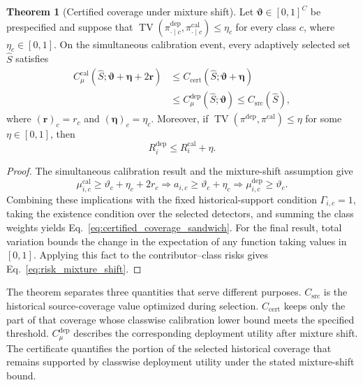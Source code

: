 \documentclass[conference]{IEEEtran}
\theoremstyle{definition}
\newtheorem{theorem}{Theorem}[section]
\begin{document}
\begin{theorem}[Certified coverage under mixture shift]
\label{thm:post_selection_certificates}
Let $\boldsymbol\vartheta\in[0,1]^C$ be prespecified and suppose that
$\operatorname{TV}(\pi_{\cdot\mid c}^{\mathrm{dep}},
\pi_{\cdot\mid c}^{\mathrm{cal}})\le\eta_c$
for every class $c$, where $\eta_c\in[0,1]$.
On the simultaneous calibration event, every adaptively selected set $\widehat S$ satisfies
\begin{equation}
\begin{aligned}
C_\mu^{\mathrm{cal}}(\widehat S;
\boldsymbol\vartheta+\boldsymbol\eta+2\boldsymbol r)
&\le C_{\mathrm{cert}}(\widehat S;
\boldsymbol\vartheta+\boldsymbol\eta)\\
&\le C_\mu^{\mathrm{dep}}(\widehat S;\boldsymbol\vartheta)
\le C_{\mathrm{src}}(\widehat S),
\end{aligned}
\label{eq:certified_coverage_sandwich}
\end{equation}
where $(\boldsymbol r)_c=r_c$ and $(\boldsymbol\eta)_c=\eta_c$.
Moreover, if $\operatorname{TV}(\pi^{\mathrm{dep}},\pi^{\mathrm{cal}})\le\eta$ for some $\eta\in[0,1]$, then
\begin{equation}
R_i^{\mathrm{dep}}\le R_i^{\mathrm{cal}}+\eta.
\label{eq:risk_mixture_shift}
\end{equation}
\end{theorem}

\begin{proof}
The simultaneous calibration result and the mixture-shift assumption give
\[
\mu_{i,c}^{\mathrm{cal}}\ge\vartheta_c+\eta_c+2r_c
\Longrightarrow a_{i,c}\ge\vartheta_c+\eta_c
\Longrightarrow\mu_{i,c}^{\mathrm{dep}}\ge\vartheta_c.
\]
Combining these implications with the fixed historical-support condition $\Gamma_{i,c}=1$, taking the existence condition over the selected detectors, and summing the class weights yields Eq.~\ref{eq:certified_coverage_sandwich}.
For the final result, total variation bounds the change in the expectation of any function taking values in $[0,1]$.
Applying this fact to the contributor--class risks gives Eq.~\ref{eq:risk_mixture_shift}.
\end{proof}

The theorem separates three quantities that serve different purposes.
$C_{\mathrm{src}}$ is the historical source-coverage value optimized during selection.
$C_{\mathrm{cert}}$ keeps only the part of that coverage whose classwise calibration lower bound meets the specified threshold.
$C_\mu^{\mathrm{dep}}$ describes the corresponding deployment utility after mixture shift.
The certificate quantifies the portion of the selected historical coverage that remains supported by classwise deployment utility under the stated mixture-shift bound.
\end{document}
